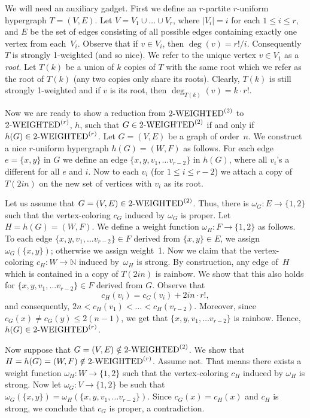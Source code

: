 \documentclass[12pt,reqno]{amsart}
\begin{document}
We will need an auxiliary gadget. First we define an $r$-partite $r$-uniform hypergraph $T=(V,E)$. Let $V=V_1\cup\dots\cup V_r$, where $|V_i|=i$ for each $1\le i\le r$, and $E$ be the set of edges consisting of all possible edges containing exactly one vertex from each~$V_i$. Observe that if $v\in V_i$, then $\deg(v) = r! / i$. Consequently $T$ is strongly 1-weighted (and so nice). We refer to the unique vertex $v\in V_1$ as a \emph{root}.
Let $T(k)$ be a union of $k$ copies of $T$ with the same root which we refer as the root of $T(k)$ (any two copies only share its roots). Clearly, 
$T(k)$ is still strongly 1-weighted and if $v$ is its root, then $\deg_{T(k)}(v) = k\cdot r!$.

Now we are ready to show a reduction from $\mbox{2-WEIGHTED}^{{(2)}}$ to $\mbox{2-WEIGHTED}^{{(r)}}$, $h$, such that $G\in \mbox{2-WEIGHTED}^{{(2)}}$ if and only if $h(G)\in\mbox{2-WEIGHTED}^{{(r)}}$.
Let $G=(V,E)$ be a graph of order~$n$. We construct a nice $r$-uniform hypergraph $h(G)=(W,F)$ as follows. For each edge $e=\{x,y\}$ in $G$ we define an edge $\{x,y,v_1,\dots v_{r-2}\}$ in $h(G)$, where all $v_i$'s a different for all $e$ and $i$. Now to each $v_i$ (for $1\le i\le r-2$) we attach a copy of $T(2in)$ on the new set of vertices with $v_i$ as its root. 

Let us assume that $G=(V,E )\in \mbox{2-WEIGHTED}^{{(2)}}$. Thus, there is $\omega_G:E\to\{1,2\}$ such that the vertex-coloring $c_G$ induced by $\omega_G$ is proper. Let $H=h(G)=(W,F)$. We define a weight function $\omega_H:F\to\{1,2\}$ as follows. To each edge $\{x,y,v_1,\dots v_{r-2}\}\in F$ derived from $\{x,y\} \in E$, we assign $\omega_G(\{x,y\})$; otherwise we assign weight~1. Now we claim that the vertex-coloring $c_H:W\to\mathbb{N}$ induced by~$\omega_H$ is strong. By construction, any edge of~$H$ which is contained in a copy of $T(2in)$ is rainbow. We show that this also holds for $\{x,y,v_1,\dots v_{r-2}\}\in F$ derived from $G$. Observe that 
\[
c_H(v_i) = c_G(v_i) + 2in \cdot r!,
\]
and consequently, $2n < c_H(v_1) < \dots < c_H(v_{r-2})$. Moreover, since $c_G(x)\neq c_G(y) \le 2(n-1)$, we get that $\{x,y,v_1,\dots v_{r-2}\}$ is rainbow. Hence, $h(G)\in \mbox{2-WEIGHTED}^{{(r)}}$.

Now suppose that $G=(V,E )\notin \mbox{2-WEIGHTED}^{{(2)}}$. We show that $H=h(G)=(W,F)\notin \mbox{2-WEIGHTED}^{{(r)}}$. Assume not. That means there exists a weight function $\omega_H:W\to\{1,2\}$ such that the vertex-coloring $c_H$ induced by $\omega_H$ is strong. Now let $\omega_G:V\to\{1,2\}$ be such that $\omega_G(\{x,y\}) = \omega_H(\{x,y,v_1,\dots v_{r-2}\})$. Since $c_G(x) = c_H(x)$ and $c_H$ is strong, we conclude that $c_G$ is proper, a contradiction.
\end{document}
